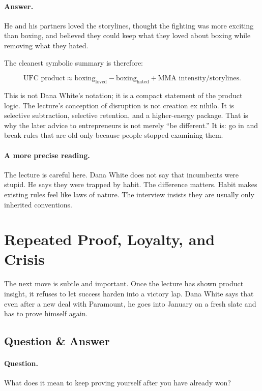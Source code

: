 \paragraph{Answer.}
He and his partners loved the storylines, thought the fighting was more exciting than boxing, and believed they could keep what they loved about boxing while removing what they hated.

The cleanest symbolic summary is therefore:

\begin{equation}
\text{UFC product}
\approx
\text{boxing}_{\mathrm{loved}}
-
\text{boxing}_{\mathrm{hated}}
+
\text{MMA intensity/storylines}.
\end{equation}

This is not Dana White's notation; it is a compact statement of the product logic. The lecture's conception of disruption is not creation ex nihilo. It is selective subtraction, selective retention, and a higher-energy package. That is why the later advice to entrepreneurs is not merely ``be different.'' It is: go in and break rules that are old only because people stopped examining them.

\paragraph{A more precise reading.}
The lecture is careful here. Dana White does not say that incumbents were stupid. He says they were trapped by habit. The difference matters. Habit makes existing rules feel like laws of nature. The interview insists they are usually only inherited conventions.

\section{Repeated Proof, Loyalty, and Crisis}

The next move is subtle and important. Once the lecture has shown product insight, it refuses to let success harden into a victory lap. Dana White says that even after a new deal with Paramount, he goes into January on a fresh slate and has to prove himself again.

\subsection{Question \& Answer}

\paragraph{Question.}
What does it mean to keep proving yourself after you have already won?

